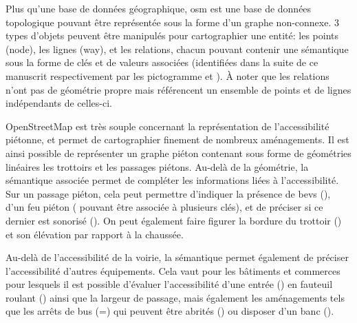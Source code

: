 Plus qu'une base de données géographique, \gls{osm} est une base de données topologique pouvant être représentée sous la forme d'un graphe non-connexe. 3 types d'objets peuvent être manipulés pour cartographier une entité: les points (node), les lignes (way), et les relations, chacun pouvant contenir une sémantique sous la forme de clés et de valeurs associées (identifiées dans la suite de ce manuscrit respectivement par les pictogramme \faKey \space et \faFileTextO). À noter que les relations n'ont pas de géométrie propre mais référencent un ensemble de points et de lignes indépendants de celles-ci.

\newpar{}


OpenStreetMap est très souple concernant la représentation de l'accessibilité piétonne, et permet de cartographier finement de nombreux aménagements. Il est ainsi possible de représenter un graphe piéton contenant sous forme de géométries linéaires les trottoirs et les passages piétons. Au-delà de la géométrie, la sémantique associée permet de compléter les informations liées à l'accessibilité. Sur un passage piéton, cela peut permettre d'indiquer la présence de \glspl{bev} (), d'un feu piéton ( pouvant être associée à plusieurs clés), et de préciser si ce dernier est sonorisé (). On peut également faire figurer la bordure du trottoir () et son élévation par rapport à la chaussée.

\newpar{}

Au-delà de l'accessibilité de la voirie, la sémantique permet également de préciser l'accessibilité d'autres équipements. Cela vaut pour les bâtiments et commerces pour lesquels il est possible d'évaluer l'accessibilité d'une entrée () en fauteuil roulant () ainsi que la largeur de passage, mais également les aménagements tels que les arrêts de bus (=) qui peuvent être abrités () ou disposer d'un banc ().

\newpar{}


